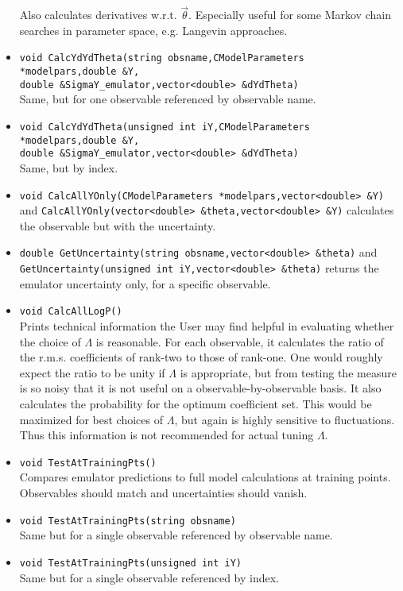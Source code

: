 \documentclass[UserManual.tex]{subfiles}
\begin{document}
\begin{itemize}
Also calculates derivatives w.r.t. $\vec{\theta}$. Especially useful for some Markov chain searches in parameter space, e.g. Langevin approaches.
\item {\tt void CalcYdYdTheta(string obsname,CModelParameters *modelpars,double \&Y,\\double \&SigmaY\_emulator,vector<double> \&dYdTheta)}\\
Same, but for one observable referenced by observable name.
\item {\tt void CalcYdYdTheta(unsigned int iY,CModelParameters *modelpars,double \&Y,\\double \&SigmaY\_emulator,vector<double> \&dYdTheta)}\\
Same, but by index.
\item {\tt void CalcAllYOnly(CModelParameters *modelpars,vector<double> \&Y)} and {\tt CalcAllYOnly(vector<double> \&theta,vector<double> \&Y)} calculates the observable but with the uncertainty.
\item {\tt double GetUncertainty(string obsname,vector<double> \&theta)} and {\tt GetUncertainty(unsigned int iY,vector<double> \&theta)} returns the emulator uncertainty only, for a specific observable.		
\item {\tt void CalcAllLogP()}\\
Prints technical information the User may find helpful in evaluating whether the choice of $\Lambda$ is reasonable. For each observable, it calculates the ratio of the r.m.s. coefficients of rank-two to those of rank-one. One would roughly expect the ratio to be unity if $\Lambda$ is appropriate, but from testing the measure is so noisy that it is not useful on a observable-by-observable basis. It also calculates the probability for the optimum coefficient set. This would be maximized for best choices of $\Lambda$, but again is highly sensitive to fluctuations. Thus this information is not recommended for actual tuning $\Lambda$.
\item {\tt void TestAtTrainingPts()}\\
Compares emulator predictions to full model calculations at training points. Observables should match and uncertainties should vanish.
\item {\tt void TestAtTrainingPts(string obsname)}\\
Same but for a single observable referenced by observable name.
\item {\tt void TestAtTrainingPts(unsigned int iY)}\\
Same but for a single observable referenced by index.

\end{itemize}
\end{document}
